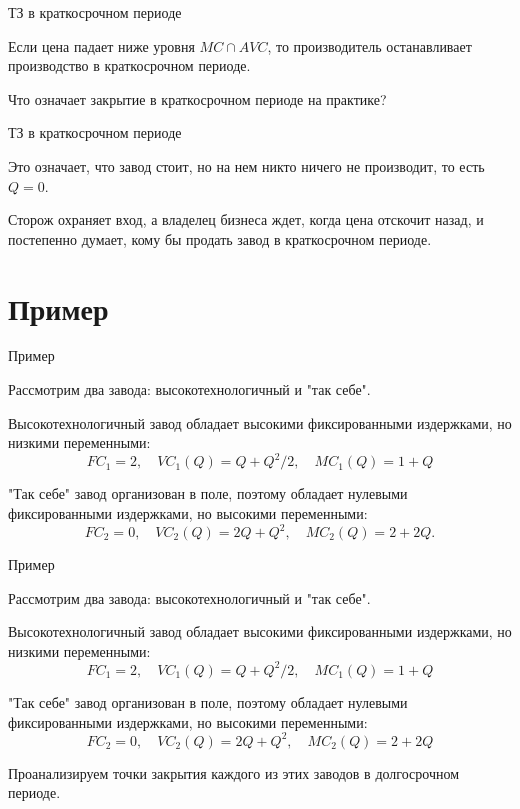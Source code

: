 \documentclass{beamer}
\begin{document}
\begin{frame}{ТЗ в краткосрочном периоде}

\begin{lemma}
Если цена падает ниже уровня $MC \cap AVC$, то производитель останавливает производство в краткосрочном периоде.
\end{lemma}

Что означает закрытие в краткосрочном периоде на практике?

\end{frame}

\begin{frame}{ТЗ в краткосрочном периоде}

Это означает, что завод стоит, но на нем никто ничего не производит, то есть $Q=0$. 

Сторож охраняет вход, а владелец бизнеса ждет, когда цена отскочит назад, и постепенно думает, кому бы продать завод в краткосрочном периоде.

\end{frame}

\section{Пример}

\begin{frame}{Пример}

Рассмотрим два завода: высокотехнологичный и "так себе". 

Высокотехнологичный завод обладает высокими фиксированными издержками, но низкими переменными:
$$FC_1 = 2, \quad VC_1(Q) = Q + Q^2/2, \quad MC_1(Q) = 1 + Q$$

"Так себе" завод организован в поле, поэтому обладает нулевыми фиксированными издержками, но высокими переменными:
$$FC_2 = 0, \quad VC_2(Q) = 2Q + Q^2, \quad MC_2(Q) = 2 + 2Q.$$

\end{frame}

\begin{frame}{Пример}

Рассмотрим два завода: высокотехнологичный и "так себе". 

Высокотехнологичный завод обладает высокими фиксированными издержками, но низкими переменными:
$$FC_1 = 2, \quad VC_1(Q) = Q + Q^2/2, \quad MC_1(Q) = 1 + Q$$

"Так себе" завод организован в поле, поэтому обладает нулевыми фиксированными издержками, но высокими переменными:
$$FC_2 = 0, \quad VC_2(Q) = 2Q + Q^2, \quad MC_2(Q) = 2 + 2Q$$

Проанализируем точки закрытия каждого из этих заводов в долгосрочном периоде.

\end{frame}
\end{document}
